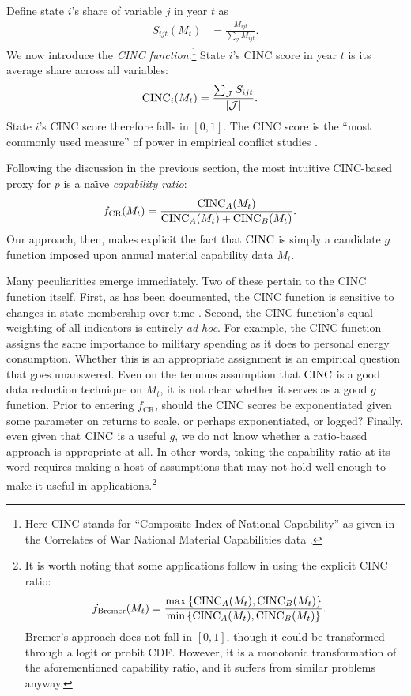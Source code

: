 Define state $i$'s share of variable $j$ in year $t$ as
\begin{align*}
  S_{ijt}(M_{t}) &= \frac{M_{ijt}}{\sum_{\mathcal{I}} M_{ijt}}.
\end{align*}
We now introduce the \emph{CINC function}.\footnote{Here CINC stands for ``Composite Index of National Capability'' as given in the Correlates of War National Material Capabilities data \citep{singer1972}.}  State $i$'s CINC score in year $t$ is its average share across all variables:
\begin{align*}
  \operatorname{CINC}_i(M_t) &= \frac{\sum_{\mathcal{J}} S_{ijt}}{\left|\mathcal{J}\right|}.
\end{align*}
State $i$'s CINC score therefore falls in $[0,1]$.  The CINC score is the ``most commonly used measure'' of power in empirical conflict studies \citep[212]{kadera2004}.

Following the discussion in the previous section, the most intuitive CINC-based proxy for $p$ is a na\"{\i}ve \emph{capability ratio}:
\begin{align*}
  f_{\text{CR}}(M_t) &= \frac{\operatorname{CINC}_A(M_t)}{\operatorname{CINC}_A(M_t) + \operatorname{CINC}_B(M_t)}.
\end{align*}
Our approach, then, makes explicit the fact that $\operatorname{CINC}$ is simply a candidate $g$ function imposed upon annual material capability data $M_t$.

Many peculiarities emerge immediately.  Two of these pertain to the CINC function itself.  First, as has been documented, the CINC function is sensitive to changes in state membership over time \citep{organski1980,gleditsch1999,kadera2004}.  Second, the CINC function's equal weighting of all indicators is entirely \emph{ad hoc}.  For example, the CINC function assigns the same importance to military spending as it does to personal energy consumption.  Whether this is an appropriate assignment is an empirical question that goes unanswered.  Even on the tenuous assumption that $\operatorname{CINC}$ is a good data reduction technique on $M_t$, it is not clear whether it serves as a good $g$ function.  Prior to entering $f_{\text{CR}}$, should the CINC scores be exponentiated given some parameter on returns to scale, or perhaps exponentiated, or logged?  Finally, even given that $\operatorname{CINC}$ is a useful $g$, we do not know whether a ratio-based approach is appropriate at all.  In other words, taking the capability ratio at its word requires making a host of assumptions that may not hold well enough to make it useful in applications.\footnote{It is worth noting that some applications follow \citet{bremer1992} in using the explicit CINC ratio:
\begin{align*}
  f_{\text{Bremer}}(M_t) &= \frac{\max\left\{\operatorname{CINC}_A(M_t),\operatorname{CINC}_B(M_t)\right\}}{\min\left\{\operatorname{CINC}_A(M_t),\operatorname{CINC}_B(M_t)\right\}}.
\end{align*}
Bremer's approach does not fall in $[0,1]$, though it could be transformed through a logit or probit CDF.  However, it is a monotonic transformation of the aforementioned capability ratio, and it suffers from similar problems anyway.}

